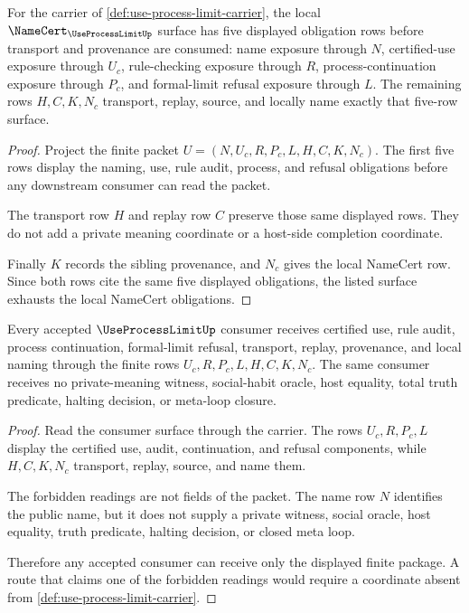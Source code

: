 \begin{theorem}
\label{thm:use-process-limit-namecert-obligations}
For the carrier of \autoref{def:use-process-limit-carrier}, the local $\NameCert_{\UseProcessLimitUp}$ surface has five displayed obligation rows before transport and provenance are consumed: name exposure through $N$, certified-use exposure through $U_c$, rule-checking exposure through $R$, process-continuation exposure through $P_c$, and formal-limit refusal exposure through $L$. The remaining rows $H,C,K,N_c$ transport, replay, source, and locally name exactly that five-row surface.
\end{theorem}
\begin{proof}
Project the finite packet $U=(N,U_c,R,P_c,L,H,C,K,N_c)$. The first five rows display the naming, use, rule audit, process, and refusal obligations before any downstream consumer can read the packet.

The transport row $H$ and replay row $C$ preserve those same displayed rows. They do not add a private meaning coordinate or a host-side completion coordinate.

Finally $K$ records the sibling provenance, and $N_c$ gives the local NameCert row. Since both rows cite the same five displayed obligations, the listed surface exhausts the local NameCert obligations.
\end{proof}

\begin{theorem}
\label{thm:use-process-limit-ledger-nonescape}
Every accepted $\UseProcessLimitUp$ consumer receives certified use, rule audit, process continuation, formal-limit refusal, transport, replay, provenance, and local naming through the finite rows $U_c,R,P_c,L,H,C,K,N_c$. The same consumer receives no private-meaning witness, social-habit oracle, host equality, total truth predicate, halting decision, or meta-loop closure.
\end{theorem}
\begin{proof}
Read the consumer surface through the carrier. The rows $U_c,R,P_c,L$ display the certified use, audit, continuation, and refusal components, while $H,C,K,N_c$ transport, replay, source, and name them.

The forbidden readings are not fields of the packet. The name row $N$ identifies the public name, but it does not supply a private witness, social oracle, host equality, truth predicate, halting decision, or closed meta loop.

Therefore any accepted consumer can receive only the displayed finite package. A route that claims one of the forbidden readings would require a coordinate absent from \autoref{def:use-process-limit-carrier}.
\end{proof}

